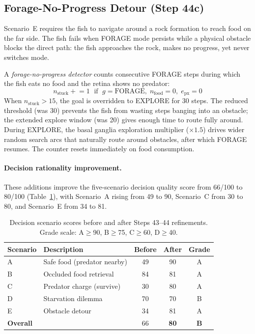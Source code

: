 \documentclass[11pt,a4paper]{article}
\begin{document}
\subsection{Forage-No-Progress Detour (Step 44c)}\label{sec:detour}

Scenario~E requires the fish to navigate around a rock formation to
reach food on the far side.  The fish fails when FORAGE mode persists
while a physical obstacle blocks the direct path: the fish approaches
the rock, makes no progress, yet never switches mode.

A \emph{forage-no-progress detector} counts consecutive FORAGE steps
during which the fish eats no food and the retina shows no predator:
\begin{equation}
  n_{\text{stuck}} \mathrel{+}= 1 \;\text{ if }\;
    g = \text{FORAGE},\; n_{\text{food}} = 0,\; e_{\text{px}} = 0
\end{equation}
When $n_{\text{stuck}} > 15$, the goal is overridden to EXPLORE for 30
steps.  The reduced threshold (was 30) prevents the fish from wasting steps
banging into an obstacle; the extended explore window (was 20) gives enough
time to route fully around.  During EXPLORE, the basal ganglia exploration
multiplier ($\times 1.5$) drives wider random search arcs that naturally route
around obstacles, after which FORAGE resumes.  The counter resets
immediately on food consumption.

\paragraph{Decision rationality improvement.}
These additions improve the five-scenario decision quality score from
66/100 to 80/100 (Table~\ref{tab:scenario_improvement}), with
Scenario~A rising from 49 to 90, Scenario~C from 30 to 80, and
Scenario~E from 34 to 81.

\begin{table}[H]
\centering
\caption{Decision scenario scores before and after Steps 43--44
  refinements.  Grade scale: A$\geq$90, B$\geq$75, C$\geq$60, D$\geq$40.}
\label{tab:scenario_improvement}
\begin{tabular}{llccc}
\hline
Scenario & Description & Before & After & Grade \\
\hline
A & Safe food (predator nearby)   & 49  & 90  & A \\
B & Occluded food retrieval        & 84  & 81  & A \\
C & Predator charge (survive)      & 30  & 80  & A \\
D & Starvation dilemma             & 70  & 70  & B \\
E & Obstacle detour                & 34  & 81  & A \\
\hline
\textbf{Overall} & & 66 & \textbf{80} & \textbf{B} \\
\hline
\end{tabular}
\end{table}
\end{document}
